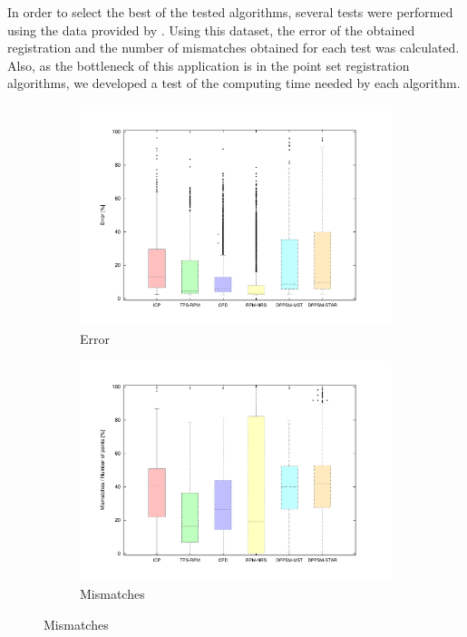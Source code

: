 In order to select the best of the tested algorithms, several tests were performed using the data provided by 
\cite{chui2000new}. Using this dataset, the error of the obtained registration and the number of mismatches obtained for 
each test was calculated. Also, as the bottleneck of this application is in the point set registration algorithms, we 
developed a test of the computing time needed by each algorithm.

\begin{figure}[t]
        \centering
        \begin{subfigure}[b]{0.5\columnwidth}
                \centering
                \includegraphics[width=\textwidth, trim=50 40 80 50,clip]{fig18.pdf}
                \caption{Error}
                \label{fig:cp02_errorChart}
        \end{subfigure}%
        \begin{subfigure}[b]{0.5\columnwidth}
                \centering
                \includegraphics[width=\textwidth, trim=50 40 80 50,clip]{fig19.pdf}
                \caption{Mismatches}
                \label{fig:cp02_mismatchesChart}
        \end{subfigure}%
        

\end{figure}
